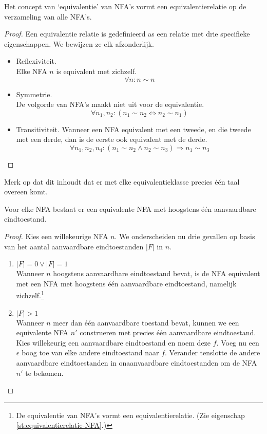 \documentclass[main.tex]{subfiles}
\begin{document}
\begin{st}
  \label{st:equivalentierelatie-NFA}
  Het concept van `equivalentie' van NFA's vormt een equivalentierelatie op de verzameling van alle NFA's.

  \begin{proof}
    Een equivalentie relatie is gedefinieerd as een relatie met drie specifieke eigenschappen.
    We bewijzen ze elk afzonderlijk.
    \begin{itemize}
    \item Reflexiviteit.\\
      Elke NFA $n$ is equivalent met zichzelf.
      \[ \forall n: n \sim n \]
    \item Symmetrie.\\
      De volgorde van NFA's maakt niet uit voor de equivalentie.
      \[ \forall n_{1},n_{2}: (n_{1} \sim n_{2} \Leftrightarrow n_{2} \sim n_{1}) \]
    \item Transitiviteit.
      Wanneer een NFA equivalent met een tweede, en die tweede met een derde, dan is de eerste ook equivalent met de derde.
      \[ \forall n_{1}, n_{2}, n_{4}: (n_{1} \sim n_{2} \wedge n_{2} \sim n_{3}) \Rightarrow n_{1} \sim n_{3} \]
    \end{itemize}
  \end{proof}
  Merk op dat dit inhoudt dat er met elke equivalentieklasse precies \'e\'en taal overeen komt.
\end{st}

\begin{st}
  \label{st:hoogstens-een-eindtoestand-NFA}
  Voor elke NFA bestaat er een equivalente NFA met hoogstens \'e\'en aanvaardbare eindtoestand.

  \begin{proof}
    Kies een willekeurige NFA $n$.
    We onderscheiden nu drie gevallen op basis van het aantal aanvaardbare eindtoestanden $|F|$ in $n$.
    \begin{enumerate}
    \item $|F| = 0 \vee |F| = 1$\\
      Wanneer $n$ hoogstens aanvaardbare eindtoestand bevat, is de NFA equivalent met een NFA met hoogstens \'e\'en aanvaardbare eindtoestand, namelijk zichzelf.\footnote{De equivalentie van NFA's vormt een equivalentierelatie. (Zie eigenschap \ref{st:equivalentierelatie-NFA}.)}
    \item $|F| > 1$\\
      Wanneer $n$ meer dan \'e\'en aanvaardbare toestand bevat, kunnen we een equivalente NFA $n'$ construeren met precies \'e\'en aanvaardbare eindtoestand.
      Kies willekeurig een aanvaardbare eindtoestand en noem deze $f$. 
      Voeg nu een $\epsilon$ boog toe van elke andere eindtoestand naar $f$.
      Verander tenslotte de andere aanvaardbare eindtoestanden in onaanvaardbare eindtoestanden om de NFA $n'$ te bekomen.
    \end{enumerate}
  \end{proof}
\end{st}
\end{document}
